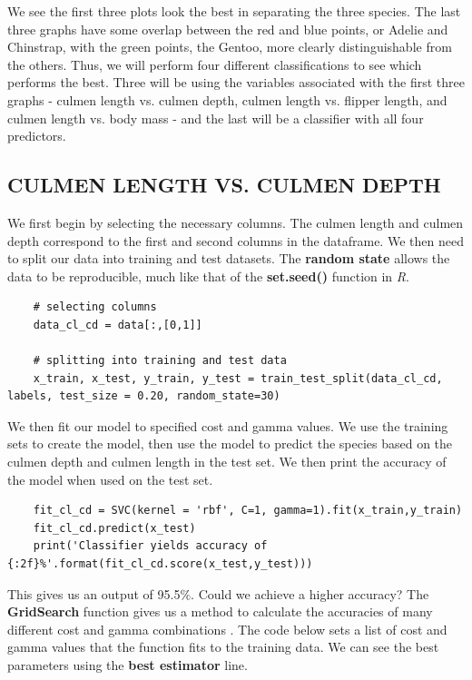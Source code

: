 \documentclass[12pt]{article}
\begin{document}
We see the first three plots look the best in separating the three species. The last three graphs have some overlap between the red and blue points, or Adelie and Chinstrap, with the green points, the Gentoo, more clearly distinguishable from the others. Thus, we will perform four different classifications to see which performs the best. Three will be using the variables associated with the first three graphs - culmen length vs. culmen depth, culmen length vs. flipper length, and culmen length vs. body mass - and the last will be a classifier with all four predictors.

\subsection{CULMEN LENGTH VS. CULMEN DEPTH}

We first begin by selecting the necessary columns. The culmen length and culmen depth correspond to the first and second columns in the dataframe. We then need to split our data into training and test datasets. The \textbf{random state} allows the data to be reproducible, much like that of the \textbf{set.seed()} function in \textit{R}.

\begin{verbatim}
    # selecting columns
    data_cl_cd = data[:,[0,1]]

    # splitting into training and test data
    x_train, x_test, y_train, y_test = train_test_split(data_cl_cd, labels, test_size = 0.20, random_state=30)
\end{verbatim}

We then fit our model to specified cost and gamma values. We use the training sets to create the model, then use the model to predict the species based on the culmen depth and culmen length in the test set. We then print the accuracy of the model when used on the test set.

\begin{verbatim}
    fit_cl_cd = SVC(kernel = 'rbf', C=1, gamma=1).fit(x_train,y_train)
    fit_cl_cd.predict(x_test)
    print('Classifier yields accuracy of {:2f}%'.format(fit_cl_cd.score(x_test,y_test)))   
\end{verbatim}

This gives us an output of 95.5\(\%\). Could we achieve a higher accuracy? The \textbf{GridSearch} function gives us a method to calculate the accuracies of many different cost and gamma combinations \cite{svm_python_tuning}. The code below sets a list of cost and gamma values that the function fits to the training data. We can see the best parameters using the \textbf{best estimator} line.
\end{document}
